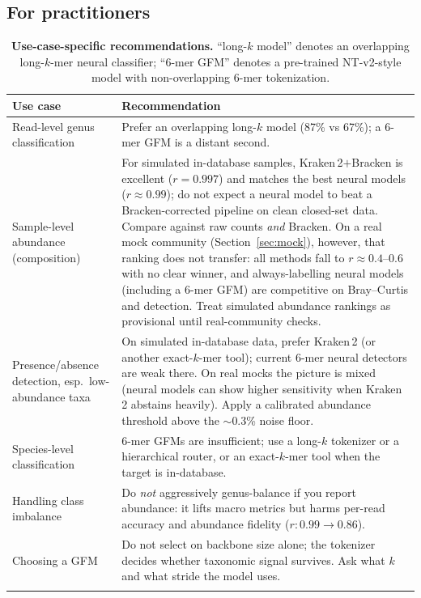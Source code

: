 \subsection{For practitioners}

\begin{table}[t]
\centering
\caption{\textbf{Use-case-specific recommendations.} ``long-$k$ model'' denotes
an overlapping long-$k$-mer neural classifier; ``6-mer GFM'' denotes a
pre-trained NT-v2-style model with non-overlapping 6-mer tokenization.}
\label{tab:reco}
\begin{tabular}{@{}p{}p{}@{}}
\toprule
Use case & Recommendation \\
\midrule
Read-level genus classification &
Prefer an overlapping long-$k$ model (87\% vs 67\%); a 6-mer GFM is a distant
second. \\[2pt]
Sample-level abundance (composition) &
For simulated in-database samples, Kraken\,2$+$Bracken is excellent ($r=0.997$)
and matches the best neural models ($r\!\approx\!0.99$); do not expect a neural
model to beat a Bracken-corrected pipeline on clean closed-set data. Compare
against raw counts \emph{and} Bracken. On a real mock community
(Section~\ref{sec:mock}), however, that ranking does not transfer: all methods
fall to $r\approx0.4$--$0.6$ with no clear winner, and always-labelling neural
models (including a 6-mer GFM) are competitive on Bray--Curtis and detection.
Treat simulated abundance rankings as provisional until real-community checks.
\\[2pt]
Presence/absence detection, esp.\ low-abundance taxa &
On simulated in-database data, prefer Kraken\,2 (or another exact-$k$-mer tool);
current 6-mer neural detectors are weak there. On real mocks the picture is
mixed (neural models can show higher sensitivity when Kraken\,2 abstains
heavily). Apply a calibrated abundance threshold above the $\sim$0.3\% noise
floor. \\[2pt]
Species-level classification &
6-mer GFMs are insufficient; use a long-$k$ tokenizer or a hierarchical router,
or an exact-$k$-mer tool when the target is in-database. \\[2pt]
Handling class imbalance &
Do \emph{not} aggressively genus-balance if you report abundance: it lifts macro
metrics but harms per-read accuracy and abundance fidelity ($r\!:0.99\!\to\!0.86$). \\[2pt]
Choosing a GFM &
Do not select on backbone size alone; the tokenizer decides whether taxonomic
signal survives. Ask what $k$ and what stride the model uses. \\
\botrule
\end{tabular}
\end{table}

